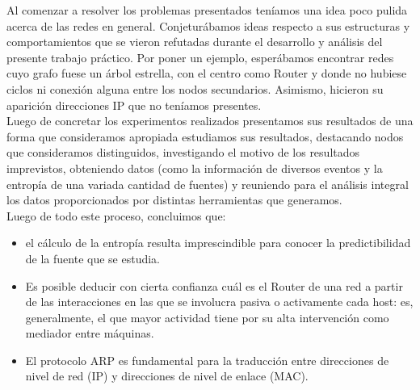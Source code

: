 Al comenzar a resolver los problemas presentados ten\'iamos una idea poco pulida acerca de las redes en general. Conjetur\'abamos ideas respecto a sus estructuras y comportamientos que se vieron refutadas durante el desarrollo y an\'alisis del presente trabajo pr\'actico. Por poner un ejemplo, esper\'abamos encontrar redes cuyo grafo fuese un \'arbol estrella, con el centro como Router y donde no hubiese ciclos ni conexi\'on alguna entre los nodos secundarios. Asimismo, hicieron su aparici\'on direcciones IP que no ten\'iamos presentes.\\
Luego de concretar los experimentos realizados presentamos sus resultados de una forma que consideramos apropiada estudiamos sus resultados, destacando nodos que consideramos distinguidos, investigando el motivo de los resultados imprevistos, obteniendo datos (como la informaci\'on de diversos eventos y la entrop\'ia de una variada cantidad de fuentes) y reuniendo para el an\'alisis integral los datos proporcionados por distintas herramientas que generamos.\\
Luego de todo este proceso, concluimos que:
\begin{itemize}
	\item el c\'alculo de la entrop\'ia resulta imprescindible para conocer la predictibilidad de la fuente que se estudia. 
	\item Es posible deducir con cierta confianza cu\'al es el Router de una red a partir de las interacciones en las que se involucra pasiva o activamente cada host: es, generalmente, el que mayor actividad tiene por su alta intervenci\'on como mediador entre m\'aquinas.
    \item El protocolo ARP es fundamental para la traducci\'on entre direcciones de nivel de red (IP) y direcciones de nivel de enlace (MAC).  
\end{itemize}
